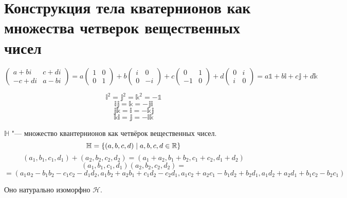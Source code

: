 \section{Конструкция тела кватернионов как множества четверок вещественных чисел}
$$\left(\begin{matrix}a + bi & c+di \\ -c+di & a-bi\end{matrix}\right) = a \left(\begin{matrix}1 & 0 \\ 0 & 1\end{matrix}\right) + b \left(\begin{matrix}i & 0 \\ 0 & -i\end{matrix}\right) + c\left(\begin{matrix}0 & 1 \\ -1 & 0\end{matrix}\right) + d\left(\begin{matrix}0 & i \\ i & 0\end{matrix}\right) = a\mathbb{1} + b\mathbb{i} + c\mathbb{j} + d\mathbb{k}$$

$$\mathbb{i}^2 = \mathbb{j}^2 = \mathbb{k}^2 = -\mathbb{1}$$
$$\mathbb{ij} = \mathbb{k} = -\mathbb{ji}$$
$$\mathbb{jk} = \mathbb{i} = -\mathbb{kj}$$
$$\mathbb{ki} = \mathbb{j} = -\mathbb{ik}$$

\begin{Def}
$\mathbb{H}$ "--- множество квантернионов как четвёрок вещественных чисел.
$$\mathbb{H} = \left\{(a, b, c, d) \mid a, b, c, d \in \mathbb{R}\right\}$$
$$(a_1, b_1, c_1, d_1) + (a_2, b_2, c_2, d_2) = (a_1 + a_2, b_1 + b_2, c_1 + c_2, d_1 + d_2)$$
$$(a_1, b_1, c_1, d_1) (a_2, b_2, c_2, d_2) = $$
$$ = (a_1a_2 - b_1b_2 - c_1c_2 - d_1d_2, a_1b_2 + a_2b_1 + c_1d_2 - c_2d_1, a_1c_2 + a_2c_1 - b_1d_2 + b_2d_1, a_1d_2 + a_2d_1 + b_1c_2 - b_2c_1)$$
\end{Def}
Оно натурально изоморфно $\mathcal{H}$.